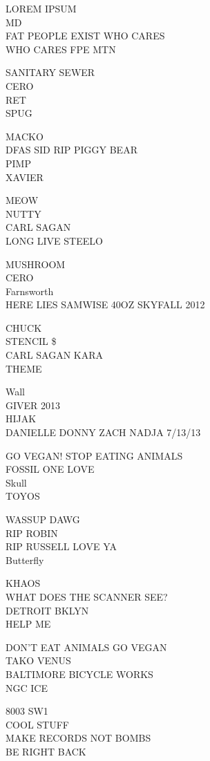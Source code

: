 \documentclass[10pt,letterpaper]{article}
\begin{document}
LOREM IPSUM\\
MD\\
FAT PEOPLE EXIST WHO CARES\\
WHO CARES FPE MTN

SANITARY SEWER\\
CERO\\
RET\\
SPUG

MACKO\\
DFAS SID RIP PIGGY BEAR\\
PIMP\\
XAVIER

MEOW\\
NUTTY\\
CARL SAGAN\\
LONG LIVE STEELO

MUSHROOM\\
CERO\\
Farnsworth\\
HERE LIES SAMWISE 40OZ SKYFALL 2012

CHUCK\\
STENCIL \$\\
CARL SAGAN KARA\\
THEME

Wall\\
GIVER 2013\\
HIJAK\\
DANIELLE DONNY ZACH NADJA 7/13/13

GO VEGAN! STOP EATING ANIMALS\\
FOSSIL ONE LOVE\\
Skull\\
TOYOS

WASSUP DAWG\\
RIP ROBIN\\
RIP RUSSELL LOVE YA\\
Butterfly

KHAOS\\
WHAT DOES THE SCANNER SEE?\\
DETROIT BKLYN\\
HELP ME

DON'T EAT ANIMALS GO VEGAN\\
TAKO VENUS\\
BALTIMORE BICYCLE WORKS\\
NGC ICE

8003 SW1\\
COOL STUFF\\
MAKE RECORDS NOT BOMBS\\
BE RIGHT BACK
\end{document}
